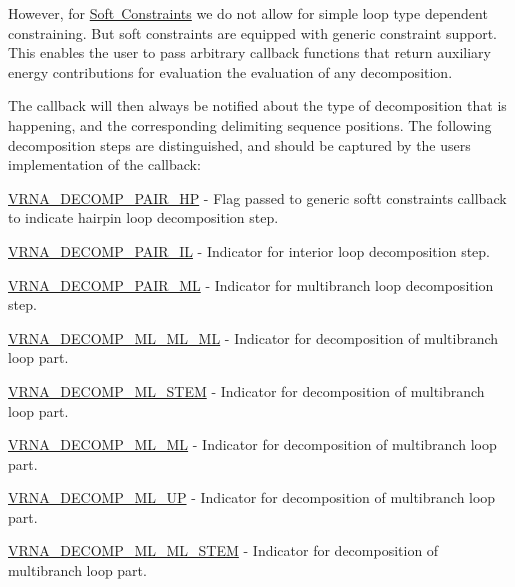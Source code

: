 However, for \mbox{\hyperlink{group__soft__constraints}{Soft Constraints}} we do not allow for simple loop type dependent constraining. But soft constraints are equipped with generic constraint support. This enables the user to pass arbitrary callback functions that return auxiliary energy contributions for evaluation the evaluation of any decomposition.

The callback will then always be notified about the type of decomposition that is happening, and the corresponding delimiting sequence positions. The following decomposition steps are distinguished, and should be captured by the user\textquotesingle{}s implementation of the callback\+:


\begin{DoxyItemize}
\item \mbox{\hyperlink{group__constraints_ga8bd41ebc8039378d242e4e8c273716a5}{V\+R\+N\+A\+\_\+\+D\+E\+C\+O\+M\+P\+\_\+\+P\+A\+I\+R\+\_\+\+HP}} -\/ Flag passed to generic softt constraints callback to indicate hairpin loop decomposition step.
\item \mbox{\hyperlink{group__constraints_gaeab04f34d7730cff2d651d782f95d857}{V\+R\+N\+A\+\_\+\+D\+E\+C\+O\+M\+P\+\_\+\+P\+A\+I\+R\+\_\+\+IL}} -\/ Indicator for interior loop decomposition step.
\item \mbox{\hyperlink{group__constraints_gaa15b1185673f0b9e900c4748d45f388f}{V\+R\+N\+A\+\_\+\+D\+E\+C\+O\+M\+P\+\_\+\+P\+A\+I\+R\+\_\+\+ML}} -\/ Indicator for multibranch loop decomposition step.
\item \mbox{\hyperlink{group__constraints_ga735517266f2e35e1374b8f1ea77ef23e}{V\+R\+N\+A\+\_\+\+D\+E\+C\+O\+M\+P\+\_\+\+M\+L\+\_\+\+M\+L\+\_\+\+ML}} -\/ Indicator for decomposition of multibranch loop part.
\item \mbox{\hyperlink{group__constraints_ga4a23054c75d8efc785de50e3ea87602f}{V\+R\+N\+A\+\_\+\+D\+E\+C\+O\+M\+P\+\_\+\+M\+L\+\_\+\+S\+T\+EM}} -\/ Indicator for decomposition of multibranch loop part.
\item \mbox{\hyperlink{group__constraints_ga7f4cb9ff7a33e67f0539bd39e7b19a78}{V\+R\+N\+A\+\_\+\+D\+E\+C\+O\+M\+P\+\_\+\+M\+L\+\_\+\+ML}} -\/ Indicator for decomposition of multibranch loop part.
\item \mbox{\hyperlink{group__constraints_gae6478dda14e50e2f2cb9ef333a29256e}{V\+R\+N\+A\+\_\+\+D\+E\+C\+O\+M\+P\+\_\+\+M\+L\+\_\+\+UP}} -\/ Indicator for decomposition of multibranch loop part.
\item \mbox{\hyperlink{group__constraints_ga63d8ceb8c96ae3b463e529e28cc0fe98}{V\+R\+N\+A\+\_\+\+D\+E\+C\+O\+M\+P\+\_\+\+M\+L\+\_\+\+M\+L\+\_\+\+S\+T\+EM}} -\/ Indicator for decomposition of multibranch loop part.

\end{DoxyItemize}
